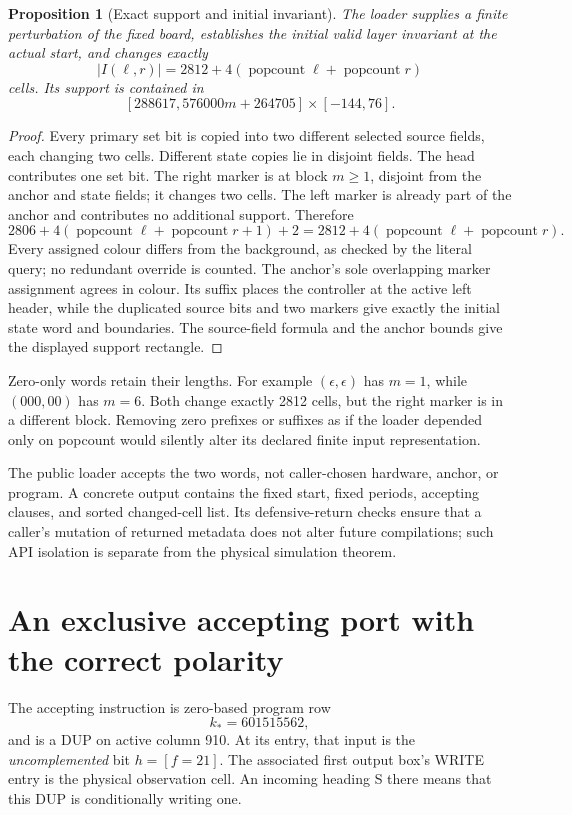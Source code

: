 \documentclass[11pt,letterpaper]{article}
\newtheorem{proposition}[theorem]{Proposition}
\theoremstyle{definition}\newtheorem{definition}[theorem]{Definition}
\theoremstyle{remark}\newtheorem{remark}[theorem]{Remark}
\newcommand{\pop}{\operatorname{popcount}}
\begin{document}
\begin{proposition}[Exact support and initial invariant]\label{ptr:la:prop:loader}
The loader supplies a finite perturbation of the fixed board, establishes the initial valid layer invariant at the actual start, and changes exactly
\begin{equation}\label{ptr:la:eq:support}
 |I(\ell,r)|=2812+4(\pop\ell+\pop r)
\end{equation}
cells. Its support is contained in
\[
 [288617,576000m+264705]\times[-144,76].
\]
\end{proposition}
\begin{proof}
Every primary set bit is copied into two different selected source fields, each changing two cells. Different state copies lie in disjoint fields. The head contributes one set bit. The right marker is at block $m\ge1$, disjoint from the anchor and state fields; it changes two cells. The left marker is already part of the anchor and contributes no additional support. Therefore
\[
2806+4(\pop\ell+\pop r+1)+2
=2812+4(\pop\ell+\pop r).
\]
Every assigned colour differs from the background, as checked by the literal query; no redundant override is counted. The anchor's sole overlapping marker assignment agrees in colour. Its suffix places the controller at the active left header, while the duplicated source bits and two markers give exactly the initial state word and boundaries. The source-field formula and the anchor bounds give the displayed support rectangle.
\end{proof}

Zero-only words retain their lengths. For example $(\epsilon,\epsilon)$ has $m=1$, while $(000,00)$ has $m=6$. Both change exactly 2812 cells, but the right marker is in a different block. Removing zero prefixes or suffixes as if the loader depended only on popcount would silently alter its declared finite input representation.

The public loader accepts the two words, not caller-chosen hardware, anchor, or program. A concrete output contains the fixed start, fixed periods, accepting clauses, and sorted changed-cell list. Its defensive-return checks ensure that a caller's mutation of returned metadata does not alter future compilations; such API isolation is separate from the physical simulation theorem.

\section{An exclusive accepting port with the correct polarity}\label{ptr:la:sec:observer}
The accepting instruction is zero-based program row
\[
 k_*=601515562,
\]
and is a DUP on active column 910. At its entry, that input is the \emph{uncomplemented} bit $h=[f=21]$. The associated first output box's WRITE entry is the physical observation cell. An incoming heading S there means that this DUP is conditionally writing one.
\end{document}
